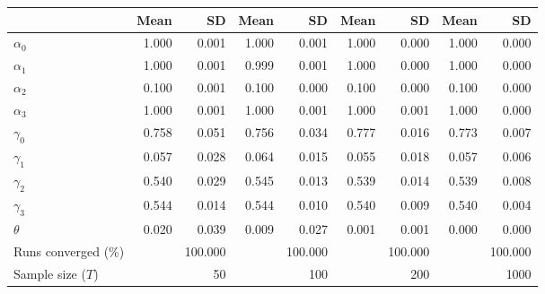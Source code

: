 
\begin{tabular}[t]{lrrrrrrrr}
\toprule
  & Mean & SD & Mean  & SD  & Mean   & SD   & Mean    & SD   \\
\midrule
$\alpha_{0}$ & 1.000 & 0.001 & 1.000 & 0.001 & 1.000 & 0.000 & 1.000 & 0.000\\
$\alpha_{1}$ & 1.000 & 0.001 & 0.999 & 0.001 & 1.000 & 0.000 & 1.000 & 0.000\\
$\alpha_{2}$ & 0.100 & 0.001 & 0.100 & 0.000 & 0.100 & 0.000 & 0.100 & 0.000\\
$\alpha_{3}$ & 1.000 & 0.001 & 1.000 & 0.001 & 1.000 & 0.001 & 1.000 & 0.000\\
$\gamma_{0}$ & 0.758 & 0.051 & 0.756 & 0.034 & 0.777 & 0.016 & 0.773 & 0.007\\
$\gamma_{1}$ & 0.057 & 0.028 & 0.064 & 0.015 & 0.055 & 0.018 & 0.057 & 0.006\\
$\gamma_{2}$ & 0.540 & 0.029 & 0.545 & 0.013 & 0.539 & 0.014 & 0.539 & 0.008\\
$\gamma_{3}$ & 0.544 & 0.014 & 0.544 & 0.010 & 0.540 & 0.009 & 0.540 & 0.004\\
$\theta$ & 0.020 & 0.039 & 0.009 & 0.027 & 0.001 & 0.001 & 0.000 & 0.000\\
Runs converged (\%) &  & 100.000 &  & 100.000 &  & 100.000 &  & 100.000\\
Sample size ($T$) &  & 50 &  & 100 &  & 200 &  & 1000\\
\bottomrule
\end{tabular}
